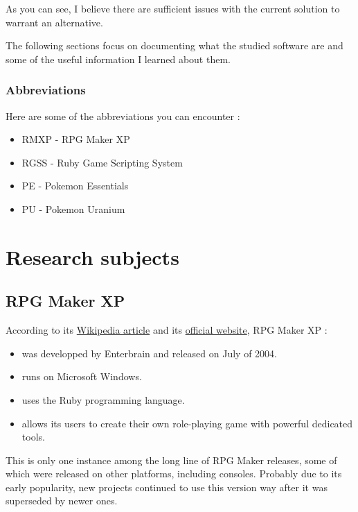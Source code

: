 \documentclass[11pt]{article}
\begin{document}
As you can see, I believe there are sufficient issues with the current solution to warrant an alternative.

The following sections focus on documenting what the studied software are and some of the useful information I learned about them.


\subsubsection{Abbreviations}

Here are some of the abbreviations you can encounter :
\begin{itemize}
	\item RMXP - RPG Maker XP
	\item RGSS - Ruby Game Scripting System
	\item PE - Pokemon Essentials
	\item PU - Pokemon Uranium
\end{itemize}





\newpage

\section{Research subjects}
\subsection{RPG Maker XP}


According to its \href{https://en.wikipedia.org/wiki/RPG_Maker#RPG_Maker_series_timeline}{Wikipedia article} and its \href{https://www.rpgmakerweb.com/products/programs/rpg-maker-xp}{official website}, RPG Maker XP :
\begin{itemize}
	\item was developped by Enterbrain and released on July of 2004.
	
	\item runs on Microsoft Windows.
	
	\item uses the Ruby programming language.
	
	\item allows its users to create their own role-playing game with powerful dedicated tools.
\end{itemize}

This is only one instance among the long line of RPG Maker releases, some of which were released on other platforms, including consoles. Probably due to its early popularity, new projects continued to use this version way after it was superseded by newer ones.
\end{document}
